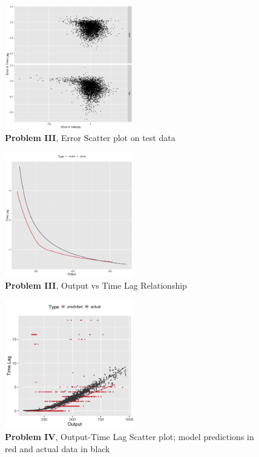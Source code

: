 \documentclass[twoside]{article}
\begin{document}
\begin{figure}[h]
\vspace{.3in}
\centerline{\includegraphics[width=0.5\textwidth]{figures/exp3_scatter_errors_test.png}}
\vspace{.3in}
\caption{\textbf{Problem III}, Error Scatter plot on test data}
\end{figure}

\begin{figure}[h]
\vspace{.3in}
\centerline{\includegraphics[width=0.5\textwidth]{figures/exp3_predictive_curves.png}}
\vspace{.3in}
\caption{\textbf{Problem III}, Output vs Time Lag Relationship}
\end{figure}


\begin{figure}[h]
\vspace{.3in}
\centerline{\includegraphics[width=0.5\textwidth]{figures/exp4_scatter_v_tl.png}}
\vspace{.3in}
\caption{\textbf{Problem IV}, Output-Time Lag Scatter plot; model predictions in red and actual data in black}
\end{figure}
\end{document}
